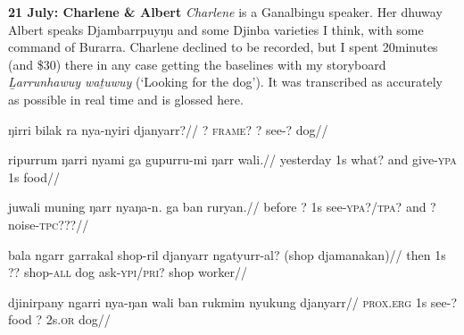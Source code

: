 \documentclass[10pt,a4paper]{article}%
\begin{document}
	
\textbf{21 July: Charlene \& Albert}
\textit{Charlene} is a Ganalbingu speaker. Her dhuway Albert speaks Djambarrpuyŋu and some Djinba varieties I think, with some command of Burarra. Charlene declined to be recorded, but I spent 20minutes (and \$30) there in any case getting the baselines with my storyboard \textit{Ḻarrunhawuy waṯuwuy} (`Looking for the dog'). It was transcribed as accurately as possible in real time and is glossed here.


\pex \a\begingl\gla ŋirri bilak ra nya-nyiri djanyarr?//
\glb ? \textsc{frame?} ? see-? dog//	\endgl



\a\begingl\gla ripurrum ŋarri nyami ga gupurru-mi ŋarr wali.//
\glb yesterday 1s  what? and give\textsc{-ypa} 1s food//	\endgl

\a\begingl\gla juwali muning ŋarr nyaŋa-n. ga ban ruryan.//
\glb before ? 1s see-\textsc{ypa?/tpa?} and ? noise-\textsc{tpc}???//	\endgl

\a\begingl\gla bala ngarr garrakal shop-ril djanyarr ngatyurr-al? (shop djamanakan)//
\glb then 1s ?? shop-\textsc{all} dog ask-\textsc{ypi/pri?} shop worker//	\endgl



\a \begingl\gla djinirpany ngarri nya-ŋan wali ban rukmim nyukung djanyarr//
\glb \textsc{prox.erg} 1s see-? food ? 2s\textsc{.or} dog// \endgl


\xe
	
	
\end{document}
